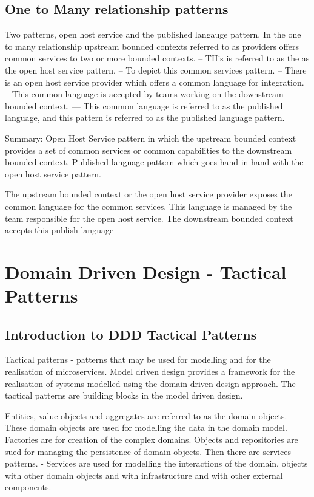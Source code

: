 \section{One to Many relationship patterns}

Two patterns, open host service and the published langauge pattern.
In the one to many relationship upstream bounded contexts referred to as providers offers common services to two or more bounded contexts.
-- THis is referred to as the as the open host service pattern.
-- To depict this common services pattern.
-- There is an open host service provider which offers a common language for integration.
-- This common language is accepted by teams working on the downstream bounded context.
--- This common language is referred to as the published language, and this pattern is referred to as the published language pattern.

Summary:
Open Host Service pattern in which the upstream bounded context provides a set of common services or common capabilities to the downstream bounded context.
Published language pattern which goes hand in hand with the open host service pattern.

The upstream bounded context or the open host service provider exposes the common language for the common services.
This language is managed by the team responsible for the open host service.
The downstream bounded context accepts this publish language

\chapter{Domain Driven Design - Tactical Patterns}
\section{Introduction to DDD Tactical Patterns}
Tactical patterns - patterns that may be used for modelling and for the realisation of microservices.
Model driven design provides a framework for the realisation of systems modelled using the domain driven design approach.
The tactical patterns are building blocks in the model driven design.

Entities, value objects and aggregates are referred to as the domain objects.
These domain objects are used for modelling the data in the domain model.
Factories are for creation of the complex domains.
Objects and repositories are sued for managing the persistence of domain objects.
Then there are services patterns.
- Services are used for modelling the interactions of the domain, objects with other domain objects and with infrastructure and with other external components. %

